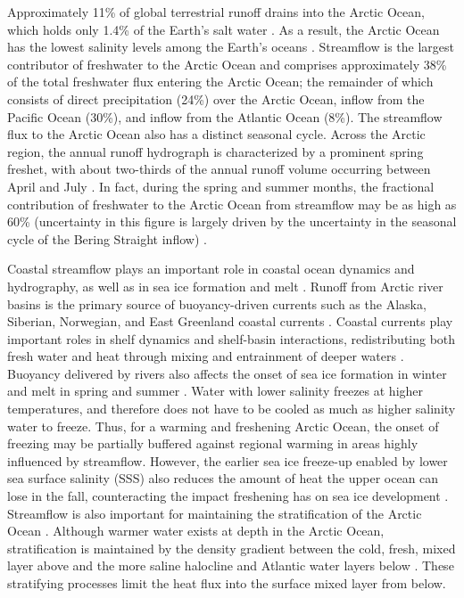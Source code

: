 \documentclass[jgrga, draft]{agutex}
\begin{document}
\begin{article}
Approximately 11\% of global terrestrial runoff drains into the Arctic Ocean, which holds only 1.4\% of the Earth's salt water \citep{Lewis_2000,Lammers_2001}.
As a result, the Arctic Ocean has the lowest salinity levels among the Earth's oceans \citep{Steele_2001}.
Streamflow is the largest contributor of freshwater to the Arctic Ocean and comprises approximately 38\% of the total freshwater flux entering the Arctic Ocean; the remainder of which consists of direct precipitation (24\%) over the Arctic Ocean, inflow from the Pacific Ocean (30\%), and inflow from the Atlantic Ocean (8\%).
The streamflow flux to the Arctic Ocean also has a distinct seasonal cycle.
Across the Arctic region, the annual runoff hydrograph is characterized by a prominent spring freshet, with about two-thirds of the annual runoff volume occurring between April and July \citep{Lammers_2001}.
In fact, during the spring and summer months, the fractional contribution of freshwater to the Arctic Ocean from streamflow may be as high as 60\% (uncertainty in this figure is largely driven by the uncertainty in the seasonal cycle of the Bering Straight inflow) \citep{Serreze_2006}.

Coastal streamflow plays an important role in coastal ocean dynamics and hydrography, as well as in sea ice formation and melt \citep{Weatherly_1996,Rabe_2011,Fichot_2013}.
Runoff from Arctic river basins is the primary source of buoyancy-driven currents such as the Alaska, Siberian, Norwegian, and East Greenland coastal currents \citep[e.g.][]{Morison_2000,Boyd_2002,McGeehan_2012,Myers_2005}.
Coastal currents play important roles in shelf dynamics and shelf-basin interactions, redistributing both fresh water and heat through mixing and entrainment of deeper waters \citep[e.g.][]{Carmack_1989,Rudels_1999,Ekwurzel_2001}.
Buoyancy delivered by rivers also affects the onset of sea ice formation in winter and melt in spring and summer \citep[e.g.][]{Weatherly_1996}.
Water with lower salinity freezes at higher temperatures, and therefore does not have to be cooled as much as higher salinity water to freeze.
Thus, for a warming and freshening Arctic Ocean, the onset of freezing may be partially buffered against regional warming in areas highly influenced by streamflow.
However, the earlier sea ice freeze-up enabled by lower sea surface salinity (SSS) also reduces the amount of heat the upper ocean can lose in the fall, counteracting the impact freshening has on sea ice development \citep{Weatherly_1996,Morison_2012}.
Streamflow is also important for maintaining the stratification of the Arctic Ocean \citep{Nummelin_2015}.
Although warmer water exists at depth in the Arctic Ocean, stratification is maintained by the density gradient between the cold, fresh, mixed layer above and the more saline halocline and Atlantic water layers below \citep{Serreze_2006}.
These stratifying processes limit the heat flux into the surface mixed layer from below.


\end{article}
\end{document}
